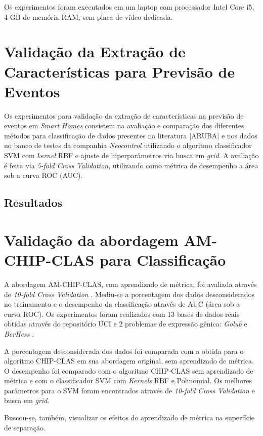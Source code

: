 \documentclass[
	12pt,				%
	openright,			%
	twoside,			%
	a4paper,			%
	english,			%
	spanish,			%
	brazil,				%
	]{abntex2}\usepackage[]{graphicx}\usepackage[]{color}
\begin{document}
Os experimentos foram executados em um laptop com processador Intel Core i5, 4 GB de memória RAM, sem placa de vídeo dedicada.

\section{Validação da Extração de Características para Previsão de Eventos}

Os experimentos para validação da extração de características na previsão de eventos em \textit{Smart Homes} consistem na avaliação e comparação dos diferentes métodos para classificação de dados presentes na literatura [ARUBA] e nos dados no banco de testes da companhia \textit{Neocontrol} utilizando o algoritmo classificador SVM com \textit{kernel} RBF e ajuste de hiperparâmetros via busca em \textit{grid}. A avaliação é feita via \textit{5-fold Cross Validation}, utilizando como métrica de desempenho a área sob a curva ROC (AUC).

\subsection{Resultados}

\section{Validação da abordagem AM-CHIP-CLAS para Classificação}

A abordagem AM-CHIP-CLAS, com aprendizado de métrica, foi avaliada através de \textit{10-fold Cross Validation} \cite{Kohavi1995}. Mediu-se a porcentagem dos dados desconsiderados no treinamento e o desempenho da classificação através de AUC (área sob a curva ROC). Os experimentos foram realizados com 13 bases de dados reais obtidas através do repositório UCI \cite{UCI} e 2 problemas de expressão gênica: \textit{Golub} \cite{Golub1999} e \textit{BcrHess} \cite{Hess2006}.
\par A porcentagem desconsiderada dos dados foi comparada com a obtida para o algoritmo CHIP-CLAS em sua abordagem original, sem aprendizado de métrica. O desempenho foi comparado com o algoritmo CHIP-CLAS sem aprendizado de métrica e com o classificador SVM com \textit{Kernels} RBF e Polinomial. Os melhores parâmetros para o SVM foram encontrados através de \textit{10-fold Cross Validation} e busca em \textit{grid}.
\par Buscou-se, também, visualizar os efeitos do aprendizado de métrica na superfície de separação.
\end{document}
